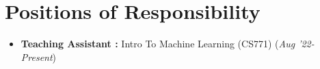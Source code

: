 \documentclass[10.8pt, a4paper]{extarticle}
\newcommand{\shorterSection}[1]{\vspace{-10pt}\section{#1}}
\begin{document}
\shorterSection{Positions of Responsibility}
\begin{itemize}
\item \textbf{Teaching Assistant :} Intro To Machine Learning (CS771) \hfill\hfill(\textit{Aug '22-Present})
\vspace{2mm}
\end{itemize}
\vspace{-2mm}






\end{document}
